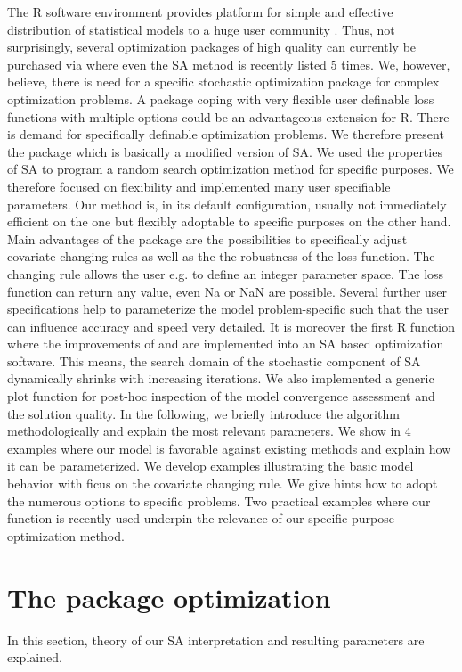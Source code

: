 The R software environment provides platform for simple and effective distribution of statistical models to a huge user community \citep{xiang_2013}. Thus, not surprisingly, several optimization packages of high quality can currently be purchased via  \citep{theussl_2016} where even the SA method is recently listed 5 times. We, however, believe, there is need for a specific stochastic optimization package for complex optimization problems. A package coping with very flexible user definable loss functions with multiple options could be an advantageous extension for R. There is demand for specifically definable optimization problems. We therefore present the package  which is basically a modified version of SA. We used the properties of SA to program a random search optimization method for specific purposes. We therefore focused on flexibility and implemented many user specifiable parameters. Our method is, in its default configuration, usually not immediately efficient on the one but flexibly adoptable to specific purposes on the other hand. Main advantages of the package are the possibilities to specifically adjust covariate changing rules as well as the the robustness of the loss function. The changing rule allows the user e.g. to define an integer parameter space. The loss function can return any value, even Na or NaN are possible. Several further user specifications help to parameterize the model problem-specific such that the user can influence accuracy and speed very detailed. It is moreover the first R function where the improvements of \citet{corana_1987} and \citet{pronzato_1984} are implemented into an SA based optimization software. This means, the search domain of the stochastic component of SA dynamically shrinks with increasing iterations. We also implemented a generic plot function for post-hoc inspection of the model convergence assessment and the solution quality. In the following, we briefly introduce the algorithm methodologically and explain the most relevant parameters. We show in 4 examples where our model is favorable against existing methods and explain how it can be parameterized. We develop examples illustrating the basic model behavior with ficus on the covariate changing rule. We give hints how to adopt the numerous options to specific problems. Two practical examples where our function is recently used underpin the relevance of our specific-purpose optimization method.

\section{The package optimization}
In this section, theory of our SA interpretation and resulting parameters are explained.

